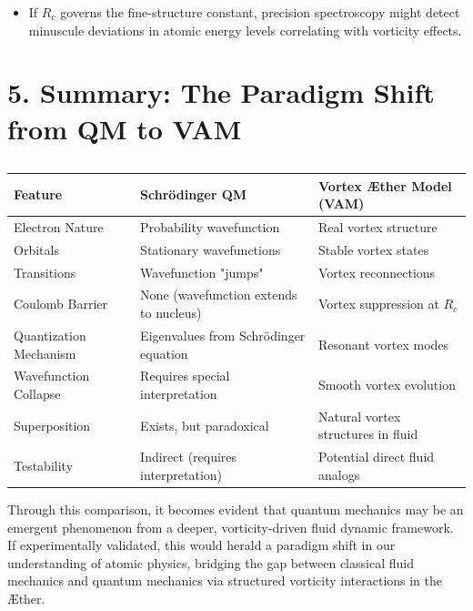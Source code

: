\begin{itemize}
    \item If \(R_c\) governs the fine-structure constant, precision spectroscopy might detect minuscule deviations in atomic energy levels correlating with vorticity effects.
\end{itemize}

\section*{5. Summary: The Paradigm Shift from QM to VAM}

\begin{table}[h]
    \centering
    \begin{tabular}{lll}
        \toprule
        \textbf{Feature} & \textbf{Schrödinger QM} & \textbf{Vortex Æther Model (VAM)} \\
        \midrule
        Electron Nature & Probability wavefunction & Real vortex structure \\
        Orbitals & Stationary wavefunctions & Stable vortex states \\
        Transitions & Wavefunction "jumps" & Vortex reconnections \\
        Coulomb Barrier & None (wavefunction extends to nucleus) & Vortex suppression at \(R_c\) \\
        Quantization Mechanism & Eigenvalues from Schrödinger equation & Resonant vortex modes \\
        Wavefunction Collapse & Requires special interpretation & Smooth vortex evolution \\
        Superposition & Exists, but paradoxical & Natural vortex structures in fluid \\
        Testability & Indirect (requires interpretation) & Potential direct fluid analogs \\
        \bottomrule
    \end{tabular}
    \caption{}
    \label{tab:QM-VAM-comparison}
\end{table}

Through this comparison, it becomes evident that quantum mechanics may be an emergent phenomenon from a deeper, vorticity-driven fluid dynamic framework. If experimentally validated, this would herald a paradigm shift in our understanding of atomic physics, bridging the gap between classical fluid mechanics and quantum mechanics via structured vorticity interactions in the Æther.